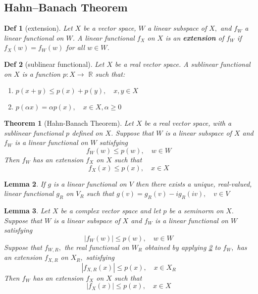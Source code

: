 \documentclass[10pt]{paper}
\newtheorem{theorem}{Theorem}[section]
\newtheorem{definition}{Def}[section]
\newtheorem{lemma}[theorem]{Lemma}
\begin{document}
\subsection{Hahn–Banach Theorem}

\begin{definition}[extension]
    Let $X$ be a vector space, $W$ a linear subspace of $X,$ and $f_{W}$ a linear functional on $W$. A linear functional $f_{X}$ on $X$ is an \textbf{extension} of $f_{W}$ if $f_{X}(w)=f_{W}(w)$ for all $w \in W$.
\end{definition}

\begin{definition}[sublinear functional]
    Let $X$ be a real vector space. A sublinear functional on $X$ is a function $p: X \rightarrow$ $\mathbb{R}$ such that:
    \begin{enumerate}
        \item $p(x+y) \leq p(x)+p(y), \quad x, y \in X$
        \item $p(\alpha x)=\alpha p(x), \quad x \in X, \alpha \geq 0$
    \end{enumerate}
\end{definition}


\begin{theorem}[Hahn-Banach Theorem]
    Let $X$ be a real vector space, with a sublinear functional $p$ defined on $X$. Suppose that $W$ is a linear subspace of $X$ and $f_{W}$ is a linear functional on $W$ satisfying
    $$
        f_{W}(w) \leq p(w), \quad w \in W
    $$
    Then $f_{W}$ has an extension $f_{X}$ on $X$ such that
    $$
        f_{X}(x) \leq p(x), \quad x \in X
    $$
\end{theorem}

\begin{lemma}\label{lf}
    If $g$ is a linear functional on $V$ then there exists a unique, real-valued, linear functional $g_{R}$ on $V_{R}$ such that $g(v)=g_{R}(v)-i g_{R}(i v), \quad v \in V$
\end{lemma}

\begin{lemma}
    Let $X$ be a complex vector space and let $p$ be a seminorm on $X .$ Suppose that $W$ is a linear subspace of $X$ and $f_{W}$ is a linear functional on $W$ satisfying
    $$
        \left|f_{W}(w)\right| \leq p(w), \quad w \in W
    $$
    Suppose that $f_{W, R},$ the real functional on $W_{R}$ obtained by applying \ref{lf} to $f_{W},$ has an extension $f_{X, R}$ on $X_{R},$ satisfying
    $$
        \left|f_{X, R}(x)\right| \leq p(x), \quad x \in X_{R}
    $$
    Then $f_{W}$ has an extension $f_{X}$ on $X$ such that
    $$
        \left|f_{X}(x)\right| \leq p(x), \quad x \in X
    $$
\end{lemma}
\end{document}
